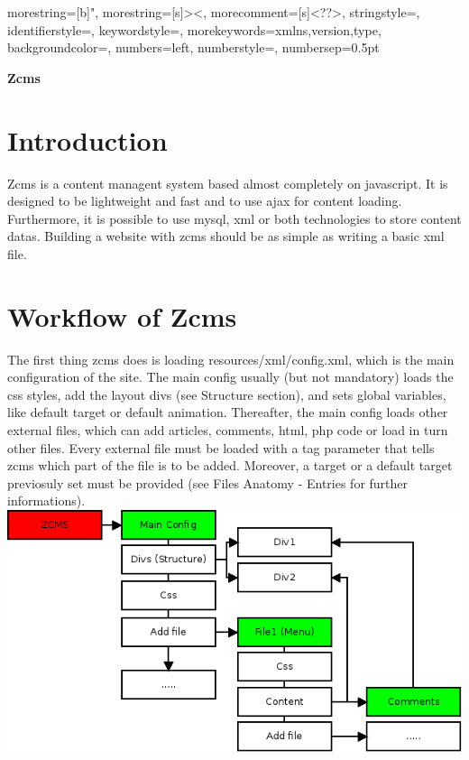 \documentclass[a4paper,12pt]{article}
\begin{document}
{
  morestring=[b]",
  morestring=[s]{>}{<},
  morecomment=[s]{<?}{?>},
  stringstyle=\color{black},
  identifierstyle=\color{darkblue},
  keywordstyle=\color{cyan},
  morekeywords={xmlns,version,type},
  backgroundcolor=\color{lightgray},
  numbers=left,
  numberstyle=\footnotesize\ttfamily\color{gray},
  numbersep=0.5pt
}
\begin{center}
 \huge \bfseries {Zcms}
\\[0.5cm]
\end{center}
\section{Introduction}
Zcms is a content managent system based almost completely on javascript. It is designed to be lightweight and fast and to use ajax for content loading. Furthermore, it is possible to use mysql, xml or both technologies to store content datas. Building a website with zcms should be as simple as writing a basic xml file.
\section{Workflow of Zcms}
The first thing zcms does is loading resources/xml/config.xml, which is the main configuration of the site. The main config usually (but not mandatory) loads the css styles, add the layout divs (see Structure section), and sets global variables, like default target or default animation. Thereafter, the main config loads other external files, which can add articles, comments, html, php code or load in turn other files. Every external file must be loaded with a tag parameter that tells zcms which part of the file is to be added. Moreover, a target or a default target previosuly set must be provided (see Files Anatomy - Entries for further informations).
\includegraphics[scale=0.7]{Diagramma_zcms.png} 
\end{document}
